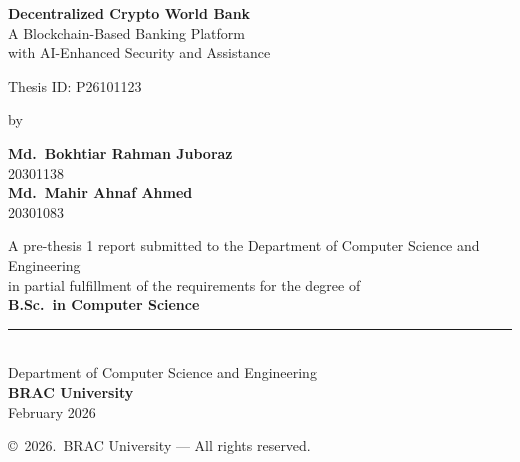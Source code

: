 \begin{titlepage}
\renewcommand*{\thepage}{Title}

\begin{center}

\vspace*{0.3cm}


\vspace{0.8cm}

{\LARGE\bfseries\color{PrimaryBlue} Decentralized Crypto World Bank}\\[0.4em]
{\large\color{PrimaryBlue!80} A Blockchain-Based Banking Platform\\[0.15em]with AI-Enhanced Security and Assistance}

\vspace{0.6cm}

{\large Thesis ID: P26101123}

\vspace{0.8cm}

{\large by}

\vspace{0.5cm}

{\Large\bfseries\color{PrimaryBlue} Md.\ Bokhtiar Rahman Juboraz}\\[0.2em]
{\color{GrayText}20301138}\\[0.8em]
{\Large\bfseries\color{PrimaryBlue} Md.\ Mahir Ahnaf Ahmed}\\[0.2em]
{\color{GrayText}20301083}

\vspace{1.2cm}

A pre-thesis 1 report submitted to the Department of Computer Science and Engineering\\
in partial fulfillment of the requirements for the degree of\\
\textbf{B.Sc.\ in Computer Science}

\vfill

{\color{PrimaryBlue}\rule{0.4\textwidth}{0.6pt}}\\[0.6em]
Department of Computer Science and Engineering\\
\textbf{BRAC University}\\
February 2026

\vspace{0.5cm}

{\small\color{GrayText}\copyright\ 2026.\ BRAC University --- All rights reserved.}

\end{center}

\end{titlepage}
